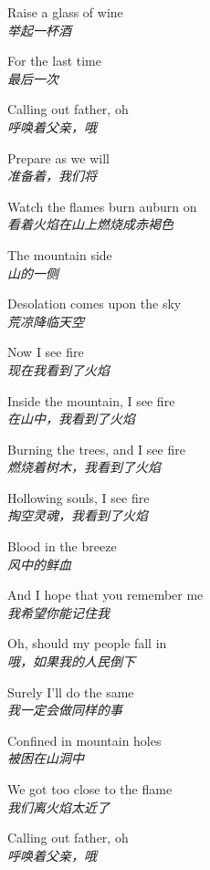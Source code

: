 \begin{spacing}{1.5}
\begin{flushleft}
Raise a glass of wine\\
\textit{举起一杯酒}\lyricspace

For the last time\\
\textit{最后一次}\lyricspace

Calling out father, oh\\
\textit{呼唤着父亲，哦}\lyricspace

Prepare as we will\\
\textit{准备着，我们将}\lyricspace

Watch the flames burn auburn on\\
\textit{看着火焰在山上燃烧成赤褐色}\lyricspace

The mountain side\\
\textit{山的一侧}\lyricspace

Desolation comes upon the sky\\
\textit{荒凉降临天空}\lyricspace

Now I see fire\\
\textit{现在我看到了火焰}\lyricspace

Inside the mountain, I see fire\\
\textit{在山中，我看到了火焰}\lyricspace

Burning the trees, and I see fire\\
\textit{燃烧着树木，我看到了火焰}\lyricspace

Hollowing souls, I see fire\\
\textit{掏空灵魂，我看到了火焰}\lyricspace

Blood in the breeze\\
\textit{风中的鲜血}\lyricspace

And I hope that you remember me\\
\textit{我希望你能记住我}\lyricspace

Oh, should my people fall in\\
\textit{哦，如果我的人民倒下}\lyricspace

Surely I'll do the same\\
\textit{我一定会做同样的事}\lyricspace

Confined in mountain holes\\
\textit{被困在山洞中}\lyricspace

We got too close to the flame\\
\textit{我们离火焰太近了}\lyricspace

Calling out father, oh\\
\textit{呼唤着父亲，哦}\lyricspace


\end{flushleft}
\end{spacing}

